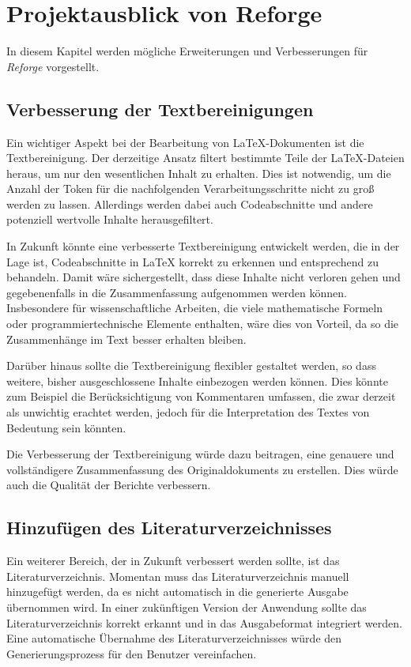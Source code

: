 \chapter{Projektausblick von Reforge}
\label{ch:ausblick}
In diesem Kapitel werden mögliche Erweiterungen und Verbesserungen für \textit{Reforge} vorgestellt.


\section{Verbesserung der Textbereinigungen}
Ein wichtiger Aspekt bei der Bearbeitung von LaTeX-Dokumenten ist die Textbereinigung. Der derzeitige Ansatz filtert bestimmte Teile der LaTeX-Dateien heraus, um nur den wesentlichen Inhalt zu erhalten. Dies ist notwendig, um die Anzahl der Token für die nachfolgenden Verarbeitungsschritte nicht zu groß werden zu lassen. Allerdings werden dabei auch Codeabschnitte und andere potenziell wertvolle Inhalte herausgefiltert.

In Zukunft könnte eine verbesserte Textbereinigung entwickelt werden, die in der Lage ist, Codeabschnitte in LaTeX korrekt zu erkennen und entsprechend zu behandeln. Damit wäre sichergestellt, dass diese Inhalte nicht verloren gehen und gegebenenfalls in die Zusammenfassung aufgenommen werden können. Insbesondere für wissenschaftliche Arbeiten, die viele mathematische Formeln oder programmiertechnische Elemente enthalten, wäre dies von Vorteil, da so die Zusammenhänge im Text besser erhalten bleiben.

Darüber hinaus sollte die Textbereinigung flexibler gestaltet werden, so dass weitere, bisher ausgeschlossene Inhalte einbezogen werden können. Dies könnte zum Beispiel die Berücksichtigung von Kommentaren umfassen, die zwar derzeit als unwichtig erachtet werden, jedoch für die Interpretation des Textes von Bedeutung sein könnten.

Die Verbesserung der Textbereinigung würde dazu beitragen, eine genauere und vollständigere Zusammenfassung des Originaldokuments zu erstellen. Dies würde auch die Qualität der Berichte verbessern.

\section{Hinzufügen des Literaturverzeichnisses}
Ein weiterer Bereich, der in Zukunft verbessert werden sollte, ist das Literaturverzeichnis. Momentan muss das Literaturverzeichnis manuell hinzugefügt werden, da es nicht automatisch in die generierte Ausgabe übernommen wird. In einer zukünftigen Version der Anwendung sollte das Literaturverzeichnis korrekt erkannt und in das Ausgabeformat integriert werden. Eine automatische Übernahme des Literaturverzeichnisses würde den Generierungsprozess für den Benutzer vereinfachen.

